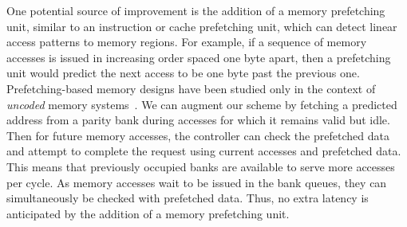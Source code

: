 One potential source of improvement is the addition of a memory prefetching unit, similar to an instruction or cache prefetching unit, which can detect linear access patterns to memory regions. For example, if a sequence of memory accesses is issued in increasing order spaced one byte apart, then a prefetching unit would predict the next access to be one byte past the previous one. 
Prefetching-based memory designs have been studied only in the context of {\em uncoded} memory systems~\cite{Kim2016, Kadjo2014, Shevgoor2015, JL2013}. We can augment our scheme by fetching a predicted address from a parity bank during accesses for which it remains valid but idle. Then for future memory accesses, the controller can check the prefetched data and attempt to complete the request using current accesses and prefetched data. This means that previously occupied banks are available to serve more accesses per cycle. As memory accesses wait to be issued in the bank queues, they can simultaneously be checked with prefetched data. Thus, no extra latency is anticipated by the addition of a memory prefetching unit.

%
%
%
%
